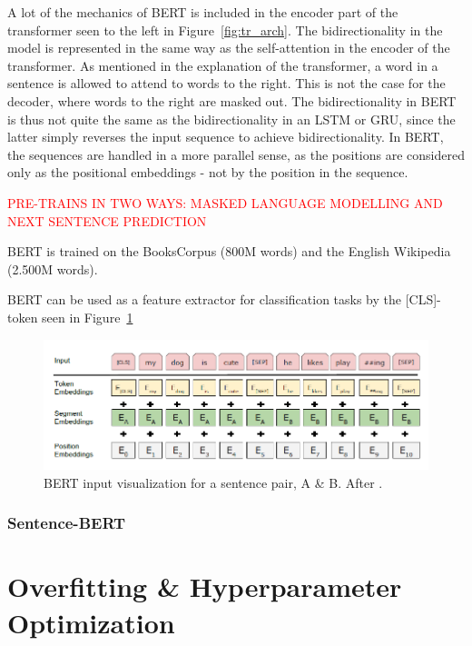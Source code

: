 A lot of the mechanics of BERT is included in the encoder part of the transformer seen to the left in Figure~\ref{fig:tr_arch}. The bidirectionality in the model is represented in the same way as the self-attention in the encoder of the transformer. As mentioned in the explanation of the transformer, a word in a sentence is allowed to attend to words to the right. This is not the case for the decoder, where words to the right are masked out. The bidirectionality in BERT is thus not quite the same as the bidirectionality in an LSTM or GRU, since the latter simply reverses the input sequence to achieve bidirectionality. In BERT, the sequences are handled in a more parallel sense, as the positions are considered only as the positional embeddings - not by the position in the sequence. 

\textcolor{red}{PRE-TRAINS IN TWO WAYS: MASKED LANGUAGE MODELLING AND NEXT SENTENCE PREDICTION}

BERT is trained on the BooksCorpus (800M words) and the English Wikipedia (2.500M words). 

BERT can be used as a feature extractor for classification tasks by the [CLS]-token seen in Figure~\ref{fig:berttokens} 

\begin{figure}
    \centering
    \includegraphics[width=\textwidth]{Figures/bert_inputrep.png}
    \caption{BERT input visualization for a sentence pair, A \& B. After \citet{devlin2018bert}.}
    \label{fig:berttokens}
\end{figure}


\subsubsection{Sentence-BERT}



\section{Overfitting \& Hyperparameter Optimization}


